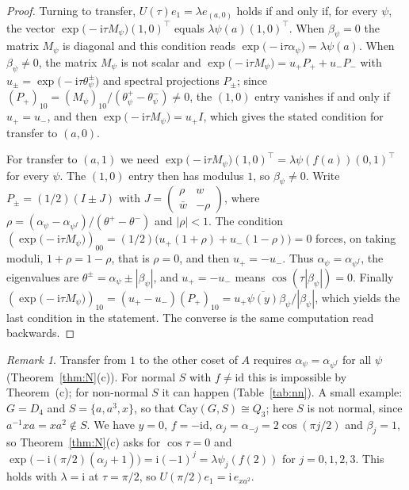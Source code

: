 \documentclass[preprint,11pt]{elsarticle}
\makeatletter
\theoremstyle{definition}
\theoremstyle{remark}
\newtheorem{remark}[theorem]{Remark}
\newcommand{\ii}{\mathrm i}
\newcommand{\SR}[1]{\@nameuse{SR@#1}}
\makeatother
\begin{document}
\begin{proof}
Turning to transfer, $U(\tau)e_1=\lambda e_{(a,0)}$ holds if and only if, for every $\psi$, the vector $\exp\bigl(-\ii\tau M_\psi\bigr)(1,0)^{\top}$ equals $\lambda\psi(a)(1,0)^{\top}$. When $\beta_\psi=0$ the matrix $M_\psi$ is diagonal and this condition reads $\exp\bigl(-\ii\tau\alpha_\psi\bigr)=\lambda\psi(a)$. When $\beta_\psi\ne0$, the matrix $M_\psi$ is not scalar and $\exp\bigl(-\ii\tau M_\psi\bigr)=u_+P_++u_-P_-$ with $u_\pm=\exp\bigl(-\ii\tau\theta^\pm_\psi\bigr)$ and spectral projections $P_\pm$; since $(P_+)_{10}=(M_\psi)_{10}/(\theta^+_\psi-\theta^-_\psi)\ne0$, the $(1,0)$ entry vanishes if and only if $u_+=u_-$, and then $\exp\bigl(-\ii\tau M_\psi\bigr)=u_+I$, which gives the stated condition for transfer to $(a,0)$.

For transfer to $(a,1)$ we need $\exp\bigl(-\ii\tau M_\psi\bigr)(1,0)^{\top}=\lambda\psi(f(a))(0,1)^{\top}$ for every $\psi$. The $(1,0)$ entry then has modulus $1$, so $\beta_\psi\ne0$. Write $P_\pm=(1/2)(I\pm J)$ with $J=\begin{pmatrix}\rho&w\\\bar w&-\rho\end{pmatrix}$, where $\rho=(\alpha_\psi-\alpha_{\psi^f})/(\theta^+-\theta^-)$ and $|\rho|<1$. The condition $(\exp\bigl(-\ii\tau M_\psi\bigr))_{00}=(1/2)\bigl(u_+(1+\rho)+u_-(1-\rho)\bigr)=0$ forces, on taking moduli, $1+\rho=1-\rho$, that is $\rho=0$, and then $u_+=-u_-$. Thus $\alpha_\psi=\alpha_{\psi^f}$, the eigenvalues are $\theta^\pm=\alpha_\psi\pm|\beta_\psi|$, and $u_+=-u_-$ means $\cos(\tau|\beta_\psi|)=0$. Finally $(\exp\bigl(-\ii\tau M_\psi\bigr))_{10}=(u_+-u_-)(P_+)_{10}=u_+\overline{\psi(y)}\beta_\psi/|\beta_\psi|$, which yields the last condition in the statement. The converse is the same computation read backwards.
\end{proof}

\begin{remark}\label{rem:N}
Transfer from $1$ to the other coset of $A$ requires $\alpha_\psi=\alpha_{\psi^f}$ for all $\psi$ (Theorem~\ref{thm:N}(c)). For normal $S$ with $f\ne\mathrm{id}$ this is impossible by Theorem~\SR{thm:C}(c); for non-normal $S$ it can happen (Table~\ref{tab:nn}). A small example: $G=D_4$ and $S=\{a,a^{3},x\}$, so that $\mathrm{Cay}(G,S)\cong Q_3$; here $S$ is not normal, since $a^{-1}xa=xa^2\notin S$. We have $y=0$, $f=-\mathrm{id}$, $\alpha_j=\alpha_{-j}=2\cos(\pi j/2)$ and $\beta_j=1$, so Theorem~\ref{thm:N}(c) asks for $\cos\tau=0$ and $\exp\bigl(-\ii(\pi/2)(\alpha_j+1)\bigr)=\ii(-1)^j=\lambda\psi_j(f(2))$ for $j=0,1,2,3$. This holds with $\lambda=\ii$ at $\tau=\pi/2$, so $U(\pi/2)e_1=\ii\,e_{xa^2}$.
\end{remark}
\end{document}
